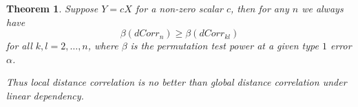 \documentclass[12pt]{article}
\newtheorem{thm}{Theorem}
\begin{document}

\begin{thm}
\label{thm2}
Suppose $Y=cX$ for a non-zero scalar $c$, then for any $n$ we always have
\begin{equation}
\label{equ1}
\beta(dCorr_{n}) \geq \beta(dCorr_{kl})
\end{equation}
for all $k,l=2,\ldots,n$, where $\beta$ is the permutation test power at a given type $1$ error $\alpha$.

Thus local distance correlation is no better than global distance correlation under linear dependency.
\end{thm}
\end{document}
